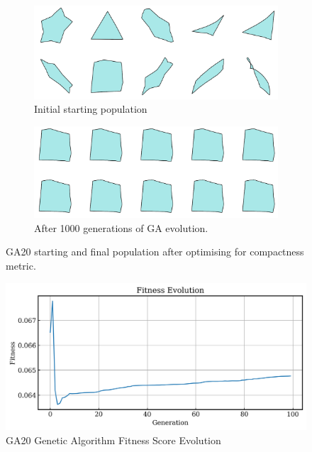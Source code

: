 \documentclass{article}
\begin{document}
\begin{figure}[H]
    \centering
    \begin{subfigure}[b]{0.45\textwidth}
        \centering
        \includegraphics[width=\textwidth]{figures/GAResults/GA20/init_pop10.png}
        \caption{Initial starting population}
        \label{fig:GA20_starting}
    \end{subfigure}
    \hfill
    \begin{subfigure}[b]{0.45\textwidth}
        \centering
        \includegraphics[width=\textwidth]{figures/GAResults/GA20/final_pop10.png}
        \caption{After 1000 generations of GA evolution.}
        \label{fig:GA20_final}
    \end{subfigure}
    \caption{GA20 starting and final population after optimising for compactness metric.}
    \label{fig:GA20_before_after_GA}
\end{figure}

\begin{figure}[H]
    \centering
    \includegraphics[width=0.75\linewidth]{figures/GAResults/GA20/10gen_fitness.png}
    \caption{GA20 Genetic Algorithm Fitness Score Evolution}
    \label{fig:GA20_fitness}
\end{figure}
\end{document}
